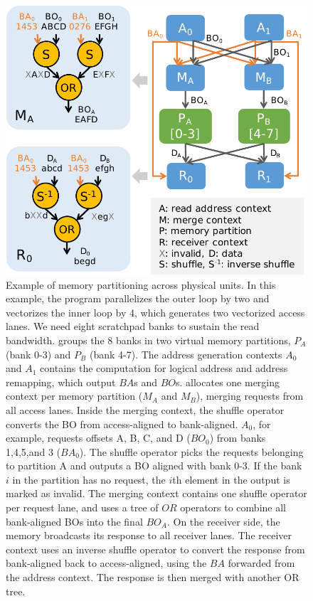 \begin{figure}
  \centering
  \includegraphics[width=0.6\columnwidth]{figs/memsplit2.pdf}
  \caption[Memory partitioning]{Example of memory partitioning across physical units. In this example, the program parallelizes the outer loop by two and vectorizes the inner loop by 4, which generates two vectorized access lanes. We need eight scratchpad banks to sustain the read bandwidth. 
  \name groups the 8 banks in two virtual memory partitions, $P_A$ (bank 0-3) and $P_B$ (bank 4-7).
  The address generation contexts $A_0$ and $A_1$ contains the computation for logical address and
  address remapping, which output $BA$s and $BO$s. \name allocates one merging context per memory partition
  ($M_A$ and $M_B$),
  merging requests from all access lanes. Inside the merging context, the shuffle operator converts the BO from access-aligned to bank-aligned. $A_0$, for example, requests offsets 
  A, B, C, and D ($BO_0$) from banks 1,4,5,and 3 ($BA_0$). The shuffle operator picks the requests belonging to partition A and outputs a BO aligned with bank 0-3. If the bank $i$ in the partition has no request, the $i$th element in the output is marked as invalid.
  The merging context contains one shuffle operator per request lane, and uses a tree of $OR$
  operators to combine all bank-aligned BOs into the final $BO_A$.
  On the receiver side, the memory broadcasts its response to all receiver lanes.
  The receiver context uses an inverse shuffle operator to convert the response from bank-aligned back to access-aligned, using the $BA$ forwarded from the address context. The response is then merged with another OR tree. 
  }
  \label{fig:memsplit}
\end{figure}

